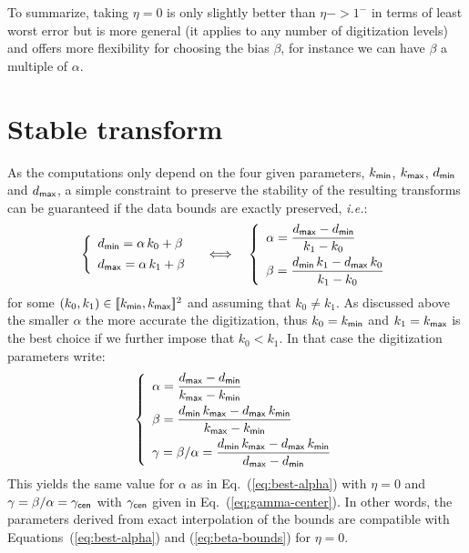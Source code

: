 \documentclass[]{article}
\newcommand*{\IntRange}[1]{[\![#1]\!]}
\begin{document}
To summarize, taking $\eta = 0$ is only slightly better than $\eta->1^-$ in
terms of least worst error but is more general (it applies to any number of
digitization levels) and offers more flexibility for choosing the bias $\beta$,
for instance we can have $\beta$ a multiple of $\alpha$.


\section{Stable transform}

As the computations only depend on the four given parameters, $k_{\mathsf{min}}$,
$k_{\mathsf{max}}$, $d_{\mathsf{min}}$ and $d_{\mathsf{max}}$, a simple constraint to preserve
the stability of the resulting transforms can be guaranteed if the data bounds
are exactly preserved, \emph{i.e.}:
\begin{displaymath}
  \left\{
  \begin{array}{l}
    d_{\mathsf{min}} = \alpha\,k_0 + \beta \\[1ex]
    d_{\mathsf{max}} = \alpha\,k_1 + \beta
  \end{array}\right.
  \quad\Longleftrightarrow \quad
  \left\{
  \begin{array}{l}
    \displaystyle
    \alpha = \frac{d_{\mathsf{max}} - d_{\mathsf{min}}}{k_1 - k_0} \\[2ex]
    \displaystyle
    \beta = \frac{d_{\mathsf{min}}\,k_1 - d_{\mathsf{max}}\,k_0}{k_1 - k_0}
  \end{array}
  \right.
\end{displaymath}
for some $(k_0,k_1) \in \IntRange{k_\Tag{min},k_\Tag{max}}^2$ and assuming that
$k_0\not=k_1$.  As discussed above the smaller $\alpha$ the more accurate the
digitization, thus $k_0 = k_{\mathsf{min}}$ and $k_1 = k_{\mathsf{max}}$ is the best
choice if we further impose that $k_0 < k_1$.   In that case the digitization
parameters write:
\begin{equation}
  \left\{
  \begin{array}{l}
    \displaystyle
    \alpha = \frac{d_{\mathsf{max}} - d_{\mathsf{min}}}
                  {k_{\mathsf{max}} - k_{\mathsf{min}}} \\[2ex]
    \displaystyle
    \beta = \frac{d_{\mathsf{min}}\,k_{\mathsf{max}} - d_{\mathsf{max}}\,k_{\mathsf{min}}}
                 {k_{\mathsf{max}} - k_{\mathsf{min}}} \\[2ex]
    \displaystyle
    \gamma = \beta/\alpha
    = \frac{d_{\mathsf{min}}\,k_{\mathsf{max}} - d_{\mathsf{max}}\,k_{\mathsf{min}}}
           {d_{\mathsf{max}} - d_{\mathsf{min}}}
  \end{array}
  \right.
  \label{eq:exact-interpolation}
\end{equation}
This yields the same value for $\alpha$ as in Eq.~(\ref{eq:best-alpha}) with
$\eta = 0$ and $\gamma = \beta/\alpha = \gamma_{\mathsf{cen}}$ with
$\gamma_{\mathsf{cen}}$ given in Eq.~(\ref{eq:gamma-center}).  In other words, the
parameters derived from exact interpolation of the bounds are compatible with
Equations~(\ref{eq:best-alpha}) and (\ref{eq:beta-bounds}) for $\eta = 0$.
\end{document}

